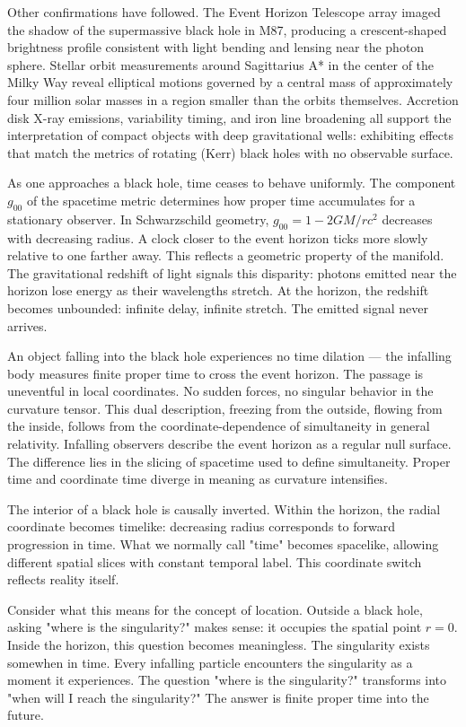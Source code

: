 Other confirmations have followed. The Event Horizon Telescope array imaged the shadow of the supermassive black hole in M87, producing a crescent-shaped brightness profile consistent with light bending and lensing near the photon sphere. Stellar orbit measurements around Sagittarius A* in the center of the Milky Way reveal elliptical motions governed by a central mass of approximately four million solar masses in a region smaller than the orbits themselves. Accretion disk X-ray emissions, variability timing, and iron line broadening all support the interpretation of compact objects with deep gravitational wells: exhibiting effects that match the metrics of rotating (Kerr) black holes with no observable surface.


As one approaches a black hole, time ceases to behave uniformly. The component $g_{00}$ of the spacetime metric determines how proper time accumulates for a stationary observer. In Schwarzschild geometry, $g_{00} = 1 - 2GM/rc^2$ decreases with decreasing radius. A clock closer to the event horizon ticks more slowly relative to one farther away. This reflects a geometric property of the manifold. The gravitational redshift of light signals this disparity: photons emitted near the horizon lose energy as their wavelengths stretch. At the horizon, the redshift becomes unbounded: infinite delay, infinite stretch. The emitted signal never arrives.


An object falling into the black hole experiences no time dilation — the infalling body measures finite proper time to cross the event horizon. The passage is uneventful in local coordinates. No sudden forces, no singular behavior in the curvature tensor. This dual description, freezing from the outside, flowing from the inside, follows from the coordinate-dependence of simultaneity in general relativity. Infalling observers describe the event horizon as a regular null surface. The difference lies in the slicing of spacetime used to define simultaneity. Proper time and coordinate time diverge in meaning as curvature intensifies.


The interior of a black hole is causally inverted. Within the horizon, the radial coordinate becomes timelike: decreasing radius corresponds to forward progression in time. What we normally call "time" becomes spacelike, allowing different spatial slices with constant temporal label. This coordinate switch reflects reality itself.

Consider what this means for the concept of location. Outside a black hole, asking "where is the singularity?" makes sense: it occupies the spatial point $r = 0$. Inside the horizon, this question becomes meaningless. The singularity exists somewhen in time. Every infalling particle encounters the singularity as a moment it experiences. The question "where is the singularity?" transforms into "when will I reach the singularity?" The answer is finite proper time into the future.

